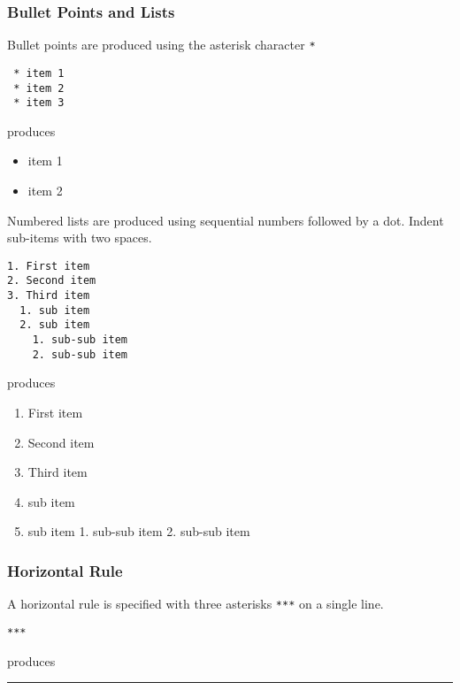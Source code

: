 \documentclass{book}
\providecommand{\tightlist}{%
      \setlength{\itemsep}{0pt}\setlength{\parskip}{0pt}}
\newcommand{\passthrough}[1]{#1}
\begin{document}
\hypertarget{bullet-points-and-lists}{%
\subsubsection{Bullet Points and Lists}\label{bullet-points-and-lists}}

Bullet points are produced using the asterisk character
\passthrough{\lstinline!*!}

\begin{lstlisting}
 * item 1
 * item 2
 * item 3
\end{lstlisting}

produces

\begin{itemize}
\tightlist
\item
  item 1
\item
  item 2
\end{itemize}

Numbered lists are produced using sequential numbers followed by a dot.
Indent sub-items with two spaces.

\begin{lstlisting}
1. First item
2. Second item
3. Third item
  1. sub item
  2. sub item
    1. sub-sub item
    2. sub-sub item
\end{lstlisting}

produces

\begin{enumerate}
\def\labelenumi{\arabic{enumi}.}
\tightlist
\item
  First item
\item
  Second item
\item
  Third item
\item
  sub item
\item
  sub item 1. sub-sub item 2. sub-sub item
\end{enumerate}

\hypertarget{horizontal-rule}{%
\subsubsection{Horizontal Rule}\label{horizontal-rule}}

A horizontal rule is specified with three asterisks
\passthrough{\lstinline!***!} on a single line.

\begin{lstlisting}
***
\end{lstlisting}

produces

\begin{center}\rule{0.5\linewidth}{\linethickness}\end{center}
\end{document}

